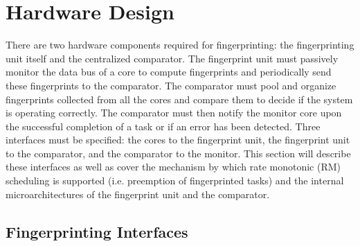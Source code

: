 
\chapter{Hardware Design} %

\label{Chapter3} %


There are two hardware components required for fingerprinting: the fingerprinting unit itself and the centralized comparator. The fingerprint unit must passively monitor the data bus of a core to compute fingerprints and periodically send these fingerprints to the comparator. The comparator must pool and organize fingerprints collected from all the cores and compare them to decide if the system is operating correctly. The comparator must then notify the monitor core upon the successful completion of a task or if an error has been detected. Three interfaces must be specified: the cores to the fingerprint unit, the fingerprint unit to the comparator, and the comparator to the monitor. This section will describe these interfaces as well as cover the mechanism by which rate monotonic (RM) scheduling is supported (i.e. preemption of fingerprinted tasks) and the internal microarchitectures of the fingerprint unit and the comparator.

\section{Fingerprinting Interfaces}
